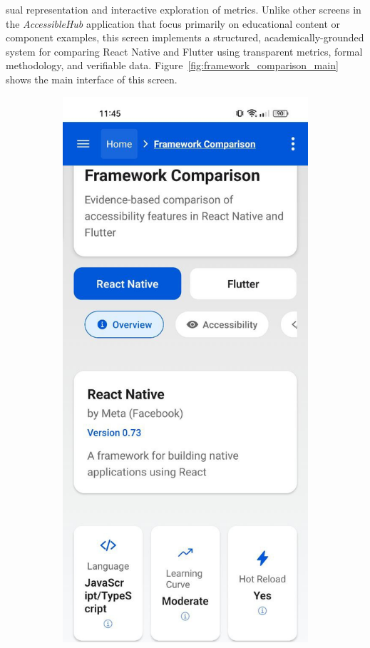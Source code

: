 sual representation and interactive exploration of metrics. Unlike other screens in the \textit{AccessibleHub} application that focus primarily on educational content or component examples, this screen implements a structured, academically-grounded system for comparing React Native and Flutter using transparent metrics, formal methodology, and verifiable data. Figure~\ref{fig:framework_comparison_main} shows the main interface of this screen.

\begin{figure}[ht]
    \centering
    \begin{subfigure}[b]{0.48\textwidth}
        \centering
        \includegraphics[width=\linewidth, alt={Framework comparison screen with React Native selected}]{img/overview1.jpg}

\end{subfigure}
\end{figure}
